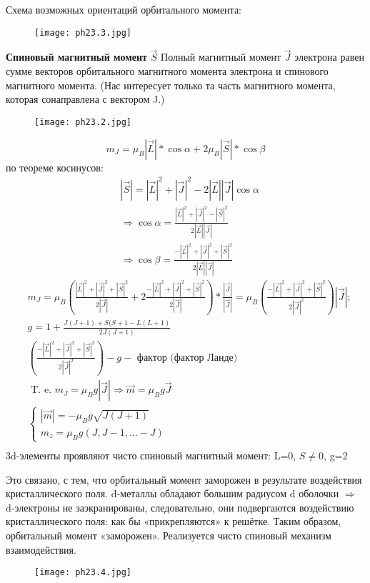 Схема возможных ориентаций орбитального момента:
\begin{figure}[h!]
    \centering
    \texttt{[image: ph23.3.jpg]}
\end{figure}

\textbf{Спиновый магнитный момент} $\Vec{S}$ 
Полный магнитный момент $\Vec{J}$ электрона равен сумме векторов орбитального магнитного момента электрона и спинового магнитного момента.
(Нас интересует только та часть магнитного момента, которая сонаправлена с вектором J.)

\begin{figure}[h!]
    \centering
    \texttt{[image: ph23.2.jpg]}
\end{figure}
$$
m_J=\mu_B|\vec{L}| * \cos \alpha+2 \mu_B|\vec{S}| * \cos \beta
$$
по теореме косинусов:
$$
\begin{aligned}
&|\vec{S}|=|\vec{L}|^2+|\vec{J}|^2-2|\vec{L}||\vec{J}| \cos \alpha \\
& \Rightarrow \cos \alpha= \frac{|\vec{L}|^2+|\vec{J}|^2-|\vec{S}|^2}{2|\vec{L}||\vec{J}|} \\
& \Rightarrow \cos \beta=\frac{-|\vec{L}|^2+|\vec{J}|^2+|\vec{S}|^2}{2|\vec{L}||\vec{J}|}
\end{aligned}
$$
$$
\begin{aligned}
& m_J=\mu_B\left(\frac{|\vec{L}|^2+|\vec{J}|^2+|\vec{S}|^2}{2|\vec{J}|}+2 \frac{-|\vec{L}|^2+|\vec{J}|^2+|\vec{S}|^2}{2|\vec{J}|}\right) * \frac{|\vec{J}|}{|\vec{J}|}=\mu_B\left(\frac{-|\vec{L}|^2+|\vec{J}|^2+|\vec{S}|^2}{2|\vec{J}|^2}\right)|\vec{J}| ; \\
& g=1+\frac{J(J+1)+S(S+1-L(L+1)}{2 J(J+1)} \\
& \left(\frac{-|\vec{L}|^2+|\vec{J}|^2+|\vec{S}|^2}{2|\vec{J}|^2}\right)-g-\text { фактор (фактор Ланде) } \\
& \text { T. e. } m_J=\mu_B  g |\vec{J}| \Rightarrow \vec{m}=\mu_B  g  \vec{J} \\
& \left\{\begin{array}{c}
|\vec{m}|=-\mu_B  g  \sqrt{J(J+1)} \\
m_z=\mu_B  g (J, J-1, \ldots-J)
\end{array}\right. \\
&
\end{aligned}
$$
3d-элементы проявляют чисто спиновый магнитный момент: L=0, $S\neq0$,  g=2

Это связано, с тем, что орбитальный момент заморожен в результате воздействия кристаллического поля.
d-металлы обладают большим радиусом d оболочки $\Rightarrow$ d-электроны не заэкранированы, следовательно, они подвергаются воздействию кристаллического поля: как бы «прикрепляются» к решётке. Таким образом, орбитальный момент «заморожен». Реализуется чисто спиновый механизм взаимодействия. 
\begin{figure}[h!]
    \centering
    \texttt{[image: ph23.4.jpg]}
\end{figure}

